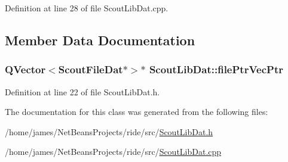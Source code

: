 Definition at line 28 of file Scout\-Lib\-Dat.\-cpp.



\subsection{Member Data Documentation}
\hypertarget{class_scout_lib_dat_ae53718a0ccc56bcdd8ae310d64acbc75}{
\subsubsection[{file\-Ptr\-Vec\-Ptr}]{\setlength{\rightskip}{0pt plus 5cm}Q\-Vector$<${\bf Scout\-File\-Dat}$\ast$$>$$\ast$ Scout\-Lib\-Dat\-::file\-Ptr\-Vec\-Ptr\hspace{0.3cm}{\ttfamily [private]}}}\label{class_scout_lib_dat_ae53718a0ccc56bcdd8ae310d64acbc75}


Definition at line 22 of file Scout\-Lib\-Dat.\-h.



The documentation for this class was generated from the following files\-:\begin{DoxyCompactItemize}
\item 
/home/james/\-Net\-Beans\-Projects/ride/src/\hyperlink{_scout_lib_dat_8h}{Scout\-Lib\-Dat.\-h}\item 
/home/james/\-Net\-Beans\-Projects/ride/src/\hyperlink{_scout_lib_dat_8cpp}{Scout\-Lib\-Dat.\-cpp}\end{DoxyCompactItemize}
